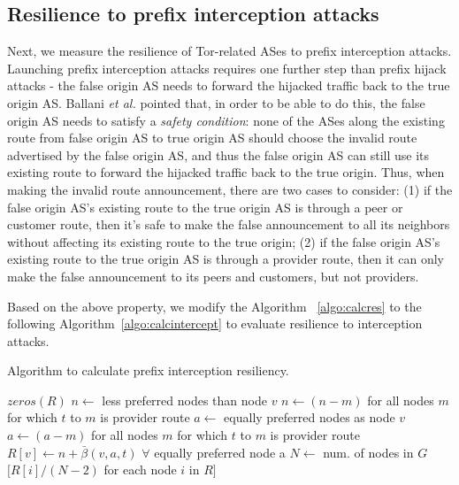 \subsection{Resilience to prefix interception attacks}
\label{interception_methodology}
Next, we measure the resilience of Tor-related ASes to prefix interception attacks. Launching prefix interception attacks requires one further step than prefix hijack attacks - the false origin AS needs to forward the hijacked traffic back to the true origin AS. Ballani \emph{et al.} \cite{ballani2007study} pointed that, in order to be able to do this, the false origin AS needs to satisfy a \emph{safety condition}: none of the ASes along the existing route from false origin AS to true origin AS should choose the invalid route advertised by the false origin AS, and thus the false origin AS can still use its existing route to forward the hijacked traffic back to the true origin. Thus, when making the invalid route announcement, there are two cases to consider: (1) if the false origin AS's existing route to the true origin AS is through a peer or customer route, then it's safe to make the false announcement to all its neighbors without affecting its existing route to the true origin; (2) if the false origin AS's existing route to the true origin AS is through a provider route, then it can only make the false announcement to its peers and customers, but not providers. 

Based on the above property, we modify the Algorithm ~\ref{algo:calcres} to the following Algorithm~\ref{algo:calcintercept} to evaluate resilience to interception attacks. 

\begin{algorithm}
\caption{Algorithm to calculate prefix interception resiliency.}
\label{algo:calcintercept}
\begin{algorithmic}
    \State {}
    \State $zeros(R)$
		\State $n \gets$ less preferred nodes than node $v$
			\State $n \gets (n - m)$ for all nodes $m$ for which $t$ to $m$ is provider route
		\EndIf
		\State $a \gets$ equally preferred nodes as node $v$
			\State $a \gets (a - m)$ for all nodes $m$ for which $t$ to $m$ is provider route
		\EndIf
		\State $R[v] \gets n + \bar{\beta}(v,a,t)$ $\forall$ equally preferred node a
	\EndIf
    \EndFor
    \State $N \gets$ num. of nodes in $G$
    \State \Return $[R[i] / (N-2)$ for each node $i$ in $R]$
\EndFunction
\end{algorithmic}
\end{algorithm}

